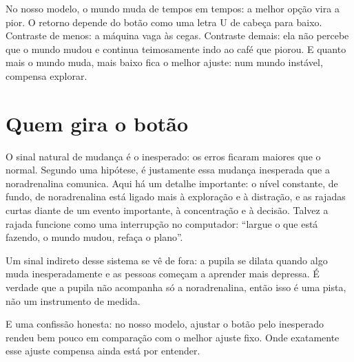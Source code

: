 No nosso modelo, o mundo muda de tempos em tempos: a melhor opção vira a pior. O retorno depende do botão como uma letra U de cabeça para baixo. Contraste de menos: a máquina vaga às cegas. Contraste demais: ela não percebe que o mundo mudou e continua teimosamente indo ao café que piorou. E quanto mais o mundo muda, mais baixo fica o melhor ajuste: num mundo instável, compensa explorar.


\section*{Quem gira o botão}

O sinal natural de mudança é o inesperado: os erros ficaram maiores que o normal. Segundo uma hipótese, é justamente essa mudança inesperada que a noradrenalina comunica. Aqui há um detalhe importante: o nível constante, de fundo, de noradrenalina está ligado mais à exploração e à distração, e as rajadas curtas diante de um evento importante, à concentração e à decisão. Talvez a rajada funcione como uma interrupção no computador: ``largue o que está fazendo, o mundo mudou, refaça o plano''.

Um sinal indireto desse sistema se vê de fora: a pupila se dilata quando algo muda inesperadamente e as pessoas começam a aprender mais depressa. É verdade que a pupila não acompanha só a noradrenalina, então isso é uma pista, não um instrumento de medida.

E uma confissão honesta: no nosso modelo, ajustar o botão pelo inesperado rendeu bem pouco em comparação com o melhor ajuste fixo. Onde exatamente esse ajuste compensa ainda está por entender.

